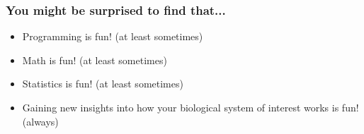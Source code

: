 \documentclass{beamer}
\begin{document}
\begin{frame}
  \frametitle{You might be surprised to find that...}

\begin{itemize}

 \item Programming is fun! (at least sometimes)
 \item Math is fun! (at least sometimes)
 \item Statistics is fun! (at least sometimes)
\bigskip
 \item Gaining new insights into how your biological system of interest works is fun! (always)

\end{itemize}

\end{frame}
\end{document}
